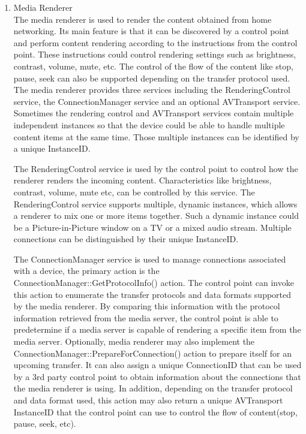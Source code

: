 \begin{enumerate}
\item Media Renderer \\ 
The media renderer is used to render the content obtained from home 
networking. Its main feature is that it can be discovered by a control point and perform content rendering according to the instructions from the control point. These instructions could control rendering settings such as brightness, contrast, volume, mute, etc. The control of the flow of the content like stop, pause, seek can also be supported depending on the transfer protocol used. The media 
renderer provides three services including the RenderingControl service, the ConnectionManager 
service and an optional AVTransport service. Sometimes the rendering control and 
AVTransport services contain multiple independent instances so that the device 
could be able to handle multiple content items at the same time. Those multiple 
instances can be identified by a unique InstanceID. 

The RenderingControl service is used by the control point to control how the renderer 
renders the incoming content. Characteristics like brightness, contrast, 
volume, mute etc, can be controlled by this service. The RenderingControl service 
supports multiple, dynamic instances, which allows a renderer to mix one or 
more items together. Such a dynamic instance could be a Picture-in-Picture window on a TV or a mixed audio stream. Multiple connections can be distinguished by their unique InstanceID. 

The ConnectionManager service is used to manage connections associated with a 
device, the primary action is the ConnectionManager::GetProtocolInfo() action. 
The control point can invoke this action to enumerate the transfer protocols and 
data formats supported by the media renderer. By comparing this information with 
the protocol information retrieved from the media server, the control point is able to 
predetermine if a media server is capable of rendering a specific item from 
the media server. Optionally, media renderer may also implement the
ConnectionManager::PrepareForConnection() action to prepare itself for an 
upcoming transfer. It can also assign a unique ConnectionID that can be used by 
a 3rd party control point to obtain information about the connections that the media 
renderer is using. In addition, depending on the transfer protocol and data 
format used, this action may also return a unique AVTransport InstanceID that the control 
point can use to control the flow of content(stop, pause, seek, etc). 


\end{enumerate}
